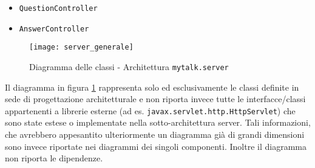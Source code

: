 \begin{itemize}[noitemsep,nolistsep]
\item \texttt{QuestionController}

\item \texttt{AnswerController}

\end {itemize}

\begin{figure}[H]
  \centering
  \texttt{[image: server\_generale]}
  \caption{Diagramma delle classi - Architettura \texttt{mytalk.server}}\label{fig:sottoarchserver}
\end{figure}

Il diagramma in figura \ref{fig:sottoarchserver} rappresenta solo ed esclusivamente le classi definite in sede di progettazione architetturale e non riporta invece tutte le interfacce/classi appartenenti a librerie esterne (ad es. \texttt{javax.servlet.http.HttpServlet}) che sono state estese o implementate nella sotto-architettura server. Tali informazioni, che avrebbero appesantito ulteriormente un diagramma già di grandi dimensioni sono invece riportate nei diagrammi dei singoli componenti.
Inoltre il diagramma non riporta le dipendenze.
\clearpage

